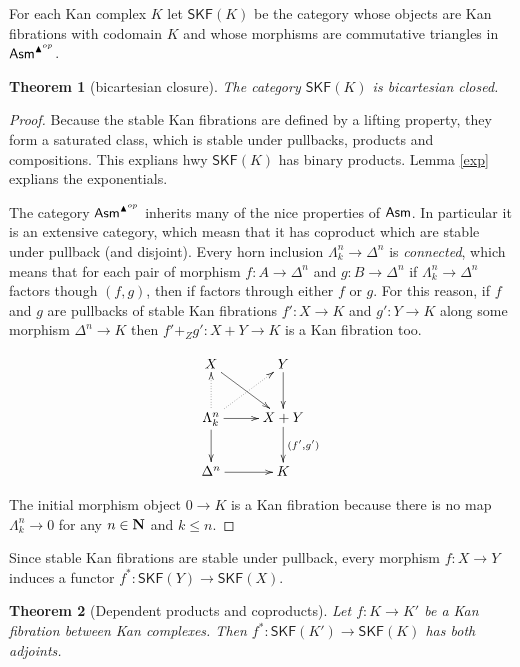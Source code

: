 \documentclass{amsart}
\theoremstyle{plain}
\newtheorem{theorem}{Theorem}
\theoremstyle{definition}
\begin{document}
\newcommand\kanfib{\mathsf{SKF}}
For each Kan complex $K$ let $\kanfib(K)$ be the category whose objects are Kan fibrations with codomain $K$ and whose morphisms are commutative triangles in $\mathsf{Asm}^{\blacktriangle^{op}}$.

\begin{theorem}[bicartesian closure] The category $\kanfib(K)$ is bicartesian closed.\label{bccc} \end{theorem}

\begin{proof} Because the stable Kan fibrations are defined by a lifting property, they form a saturated class, which is stable under pullbacks, products and compositions. This explians hwy $\kanfib(K)$ has binary products. Lemma \ref{exp} explians the exponentials. 

The category $\mathsf{Asm}^{\blacktriangle^{op}}$ inherits many of the nice properties of $\mathsf{Asm}$. In particular it is an extensive category, which measn that it has coproduct which are stable under pullback (and disjoint). Every horn inclusion $\Lambda^n_k \to \Delta^n$ is \emph{connected}, which means that for each pair of morphism $f:A\to \Delta^n$ and $g:B\to \Delta^n$ if $\Lambda^n_k \to \Delta^n$ factors though $(f,g)$, then if factors through either $f$ or $g$. For this reason, if $f$ and $g$ are pullbacks of stable Kan fibrations $f':X\to K$ and $g':Y\to K$ along some morphism $\Delta^n\to K$ then $f'+_Z g':X+Y \to K$ is a Kan fibration too.

\[\xymatrix{
X \ar[dr] & Y \ar[d]\\ 
\Lambda^n_k\ar[d] \ar[r]\ar@{.>}[u]\ar@{.>}[ur] &  X+Y \ar[d]^{(f',g')}\\
\Delta^n \ar[r] & K
}\]

The initial morphism object $0\to K$ is a Kan fibration because there is no map $\Lambda^n_k \to 0$ for any $n\in \mathbf{N}$ and $k\leq n$.
\end{proof}

\newcommand\ri{^*}
Since stable Kan fibrations are stable under pullback, every morphism $f:X\to Y$ induces a functor $f\ri:\kanfib(Y) \to \kanfib(X)$.

\begin{theorem}[Dependent products and coproducts] Let $f:K\to K'$ be a Kan fibration between Kan complexes. Then $f\ri:\kanfib(K') \to \kanfib(K)$ has both adjoints. \end{theorem}
\end{document}
